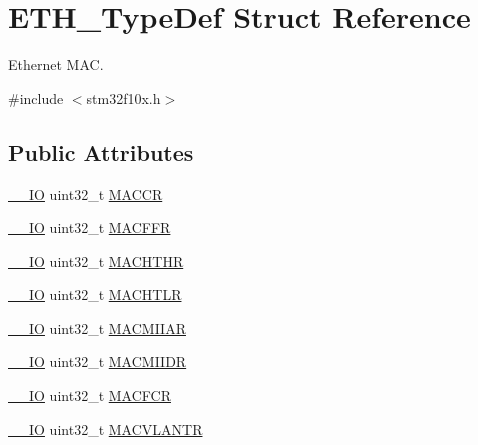 \hypertarget{struct_e_t_h___type_def}{}\section{E\+T\+H\+\_\+\+Type\+Def Struct Reference}
\label{struct_e_t_h___type_def}


Ethernet M\+AC.  




{\ttfamily \#include $<$stm32f10x.\+h$>$}

\subsection*{Public Attributes}
\begin{DoxyCompactItemize}
\item 
\hyperlink{core__sc300_8h_aec43007d9998a0a0e01faede4133d6be}{\+\_\+\+\_\+\+IO} uint32\+\_\+t \hyperlink{struct_e_t_h___type_def_a68d7e7c68b5b8adcf7b2b96bc1eea7d9}{M\+A\+C\+CR}
\item 
\hyperlink{core__sc300_8h_aec43007d9998a0a0e01faede4133d6be}{\+\_\+\+\_\+\+IO} uint32\+\_\+t \hyperlink{struct_e_t_h___type_def_afdf573860dd5dcd13f2b6b19dcb92cc1}{M\+A\+C\+F\+FR}
\item 
\hyperlink{core__sc300_8h_aec43007d9998a0a0e01faede4133d6be}{\+\_\+\+\_\+\+IO} uint32\+\_\+t \hyperlink{struct_e_t_h___type_def_ace541cc94118ec2db7c930a44960aa18}{M\+A\+C\+H\+T\+HR}
\item 
\hyperlink{core__sc300_8h_aec43007d9998a0a0e01faede4133d6be}{\+\_\+\+\_\+\+IO} uint32\+\_\+t \hyperlink{struct_e_t_h___type_def_a22bd30c653a4c1c8f46a59e0a821dcf8}{M\+A\+C\+H\+T\+LR}
\item 
\hyperlink{core__sc300_8h_aec43007d9998a0a0e01faede4133d6be}{\+\_\+\+\_\+\+IO} uint32\+\_\+t \hyperlink{struct_e_t_h___type_def_af697fcc940139f7dcb483766420852be}{M\+A\+C\+M\+I\+I\+AR}
\item 
\hyperlink{core__sc300_8h_aec43007d9998a0a0e01faede4133d6be}{\+\_\+\+\_\+\+IO} uint32\+\_\+t \hyperlink{struct_e_t_h___type_def_a3d4c60bb689285b937c939b36a1233a3}{M\+A\+C\+M\+I\+I\+DR}
\item 
\hyperlink{core__sc300_8h_aec43007d9998a0a0e01faede4133d6be}{\+\_\+\+\_\+\+IO} uint32\+\_\+t \hyperlink{struct_e_t_h___type_def_acdbe493d9d68ddfed4c758f0a7bde058}{M\+A\+C\+F\+CR}
\item 
\hyperlink{core__sc300_8h_aec43007d9998a0a0e01faede4133d6be}{\+\_\+\+\_\+\+IO} uint32\+\_\+t \hyperlink{struct_e_t_h___type_def_a0792c8c170502e3466518d200ca297c3}{M\+A\+C\+V\+L\+A\+N\+TR}

\end{DoxyCompactItemize}
